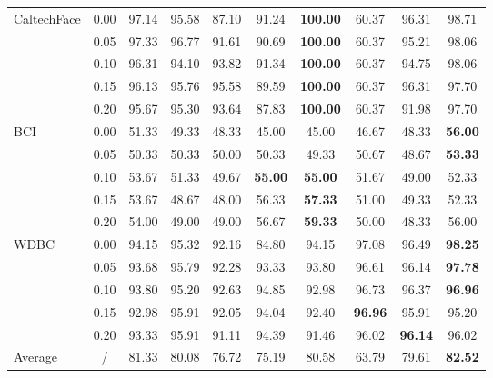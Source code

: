 \documentclass[sn-mathphys]{JORSC-jnl}%
\theoremstyle{thmstyleone}%
\theoremstyle{thmstylethree}%
\theoremstyle{thmstyleone} %
\begin{document}
\begin{table}[t]
\begin{adjustbox}{width=\textwidth}
\begin{tabular}{lccccccccc}
\multirow{5}{*}{CaltechFace}
& 0.00 & 97.14 & 95.58 & 87.10 & 91.24 & \textbf{100.00} & 60.37 & 96.31 & 98.71 \\
& 0.05 & 97.33 & 96.77 & 91.61 & 90.69 & \textbf{100.00} & 60.37 & 95.21 & 98.06 \\
& 0.10 & 96.31 & 94.10 & 93.82 & 91.34 & \textbf{100.00} & 60.37 & 94.75 & 98.06 \\
& 0.15 & 96.13 & 95.76 & 95.58 & 89.59 & \textbf{100.00} & 60.37 & 96.31 & 97.70 \\
& 0.20 & 95.67 & 95.30 & 93.64 & 87.83 & \textbf{100.00} & 60.37 & 91.98 & 97.70 \\
\midrule  

\multirow{5}{*}{BCI}
& 0.00 & 51.33 & 49.33 & 48.33 & 45.00 & 45.00 & 46.67 & 48.33 & \textbf{56.00} \\
& 0.05 & 50.33 & 50.33 & 50.00 & 50.33 & 49.33 & 50.67 & 48.67 & \textbf{53.33} \\
& 0.10 & 53.67 & 51.33 & 49.67 & \textbf{55.00} & \textbf{55.00} & 51.67 & 49.00 & 52.33 \\
& 0.15 & 53.67 & 48.67 & 48.00 & 56.33 & \textbf{57.33} & 51.00 & 49.33 & 52.33 \\
& 0.20 & 54.00 & 49.00 & 49.00 & 56.67 & \textbf{59.33} & 50.00 & 48.33 & 56.00 \\
\midrule  

\multirow{5}{*}{WDBC}
& 0.00 & 94.15 & 95.32 & 92.16 & 84.80 & 94.15 & 97.08 & 96.49 & \textbf{98.25} \\
& 0.05 & 93.68 & 95.79 & 92.28 & 93.33 & 93.80 & 96.61 & 96.14 & \textbf{97.78} \\
& 0.10 & 93.80 & 95.20 & 92.63 & 94.85 & 92.98 & 96.73 & 96.37 & \textbf{96.96} \\
& 0.15 & 92.98 & 95.91 & 92.05 & 94.04 & 92.40 & \textbf{96.96} & 95.91 & 95.20 \\
& 0.20 & 93.33 & 95.91 & 91.11 & 94.39 & 91.46 & 96.02 & \textbf{96.14} & 96.02 \\
\midrule  

Average & / & 81.33 & 80.08 & 76.72 & 75.19 & 80.58 & 63.79 & 79.61 & \textbf{82.52} \\
\bottomrule  
\end{tabular}
\end{adjustbox}
\end{table}
\end{document}
